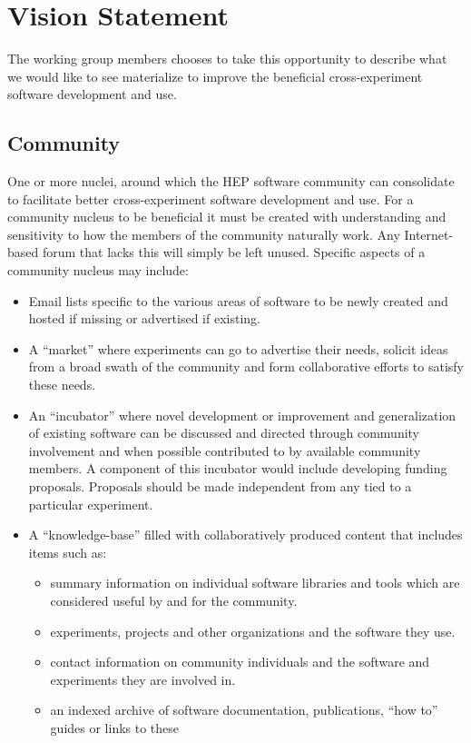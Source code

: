 \section{Vision Statement}

The working group members chooses to take this opportunity to describe
what we would like to see materialize to improve the beneficial
cross-experiment software development and use.

\subsection{Community}

One or more nuclei, around which the HEP software community can
consolidate to facilitate better cross-experiment software development
and use.  For a community nucleus to be beneficial it must be created
with understanding and sensitivity to how the members of the community
naturally work.  Any Internet-based forum that lacks this will simply
be left unused.  Specific aspects of a community nucleus may include:

\begin{itemize}
\item Email lists specific to the various areas of software to be
  newly created and hosted if missing or advertised if existing.
\item A ``market'' where experiments can go to advertise their needs,
  solicit ideas from a broad swath of the community and form
  collaborative efforts to satisfy these needs.
\item An ``incubator'' where novel development or improvement and
  generalization of existing software can be discussed and directed
  through community involvement and when possible contributed to by
  available community members.  A component of this incubator would
  include developing funding proposals.  Proposals should be made
  independent from any tied to a particular experiment.
\item A ``knowledge-base'' filled with collaboratively produced content
  that includes items such as:
  \begin{itemize}
  \item summary information on individual software libraries and tools
    which are considered useful by and for the community.
  \item experiments, projects and other organizations and the software they use.
  \item contact information on community individuals and the software
    and experiments they are involved in.
  \item an indexed archive of software documentation, publications,
    ``how to'' guides or links to these
  \end{itemize}
\end{itemize}

